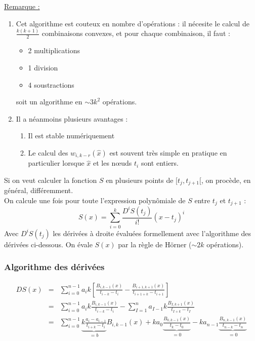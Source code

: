 \bigskip
\underline{Remarque :} \begin{enumerate}
	\item Cet algorithme est couteux en nombre d'opérations : il nécesite le calcul de $\frac{k(k+1)}{2}$ combinaisons convexes, et pour chaque combinaison, il faut :
	\begin{itemize}
		\item 2 multiplications
		\item 1 division
		\item 4 soustractions
	\end{itemize}
	soit un algorithme en $\sim3k^2$ opérations.
	\item Il a néanmoins plusieurs avantages : \begin{enumerate}
		\item Il est stable numériquement
		\item Le calcul des $w_{i,k-r}(\hat{x})$ est souvent très simple en pratique en particulier lorsque $\hat{x}$ et les n\oe uds $t_i$ sont entiers.
	\end{enumerate}
\end{enumerate}

Si on veut calculer la fonction $S$ en plusieurs points de $[t_j, t_{j+1}[$, on procède, en général, différemment.\\
On calcule une fois pour toute l'expression polynômiale de $S$ entre $t_j$ et $t_{j+1}$ :
	\[S(x)=\sum_{i=0}^k \frac{D^iS(t_j)}{i!} (x-t_j)^i\]
Avec $D^iS(t_j)$ les dérivées à droite évaluées formellement avec l'algorithme des dérivées ci-dessous. On évale $S(x)$ par la règle de Hörner ($\sim2k$ opérations).

\subsubsection{Algorithme des dérivées}

\begin{dem}
\begin{eqnarray*}
DS(x)&=&\sum_{i=0}^{n-1} a_i k \left[\frac{B_{i,k-1}(x)}{t_{i-k}-t_i} - \frac{B_{i+1,k+1}(x)}{t_{i+1+k}-t_{i+1}} \right] \\
	&=&\sum_{i=0}^{n-1} a_i k \frac{B_{i,k-1}(x)}{t_{i-k}-t_i} - \sum_{I=1}^{n}a_{I-1} k \frac{B_{I,k+1}(x)}{t_{I+k}-t_{I}}\\
	&=&\sum_{i=0}^{n-1} \underbrace{k \frac{a_i-a_{i-1}}{t_{i+k}-t_i}}_{=b} B_{i,k-1}(x) + ka_0\underbrace{\frac{B_{0,k-1}(x)}{t_k-t_0}}_{=0} - ka_{n-1}\underbrace{\frac{B_{n,k-1}(x)}{t_{n-k}-t_n}}_{=0}
\end{eqnarray*}
\end{dem}

